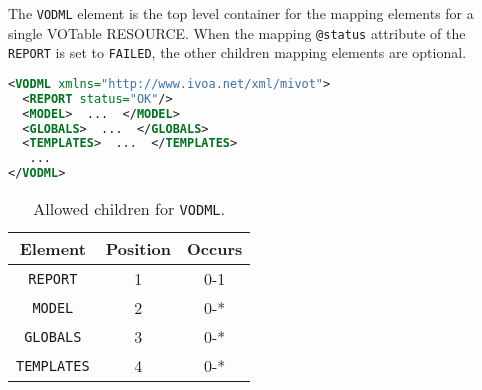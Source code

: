 The \texttt{VODML} element is the top level container for the mapping elements for a single VOTable RESOURCE.
When the mapping \texttt{@status} attribute of the \texttt{REPORT} is set to \texttt{FAILED}, the other children mapping elements are optional.

\begin{lstlisting}[caption={Example \texttt{VODML} mapping block.},language=XML]
<VODML xmlns="http://www.ivoa.net/xml/mivot">
  <REPORT status="OK"/>
  <MODEL>  ...  </MODEL>
  <GLOBALS>  ...  </GLOBALS>
  <TEMPLATES>  ...  </TEMPLATES>
   ...
</VODML>
\end{lstlisting}

\begin{table}[!htbp]
  \small
  \centering
  \begin{tabulary}{\linewidth}{|c |c |c|}
    \hline 
        \textbf{Element} &
        \textbf{Position} &
        \textbf{Occurs}\\
    \hline
    \hline  
      \texttt{REPORT} &           
      1 &           
      0-1\\
    \hline  
      \texttt{MODEL} &           
      2 &           
      0-*\\
    \hline    
      \texttt{GLOBALS} &           
      3 &           
      0-*\\
    \hline  
      \texttt{TEMPLATES} &           
      4 &           
      0-*\\
    \hline 
  \end{tabulary}
    \caption{Allowed children for \texttt{VODML}.} 
    \label{tbl:vodml-children}
\end{table}


